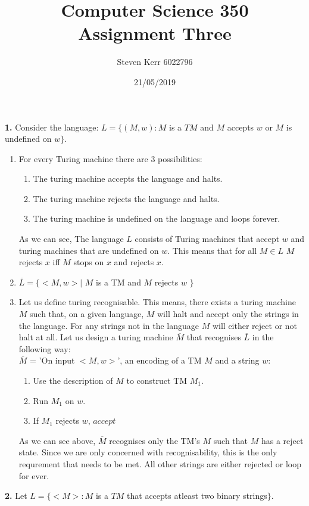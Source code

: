 \documentclass[a4paper,12pt]{article}
\title{Computer Science 350 \\
\large Assignment Three}
\author{Steven Kerr 6022796}
\date{21/05/2019}
\begin{document}
\maketitle

\noindent \textbf{1.}
Consider the language: $L=\{(M,w) : M$ is a $TM$ and $M$ accepts $w$ or $M$ is undefined on $w\}$.
\noindent \begin{enumerate}[label=\alph*)]
\item For every Turing machine there are 3 possibilities:
\begin{enumerate}
\item The turing machine accepts the language and halts.
\item The turing machine rejects the language and halts.
\item The turing machine is undefined on the language and loops forever.
\end{enumerate}
As we can see, The language $L$ consists of Turing machines that accept $w$ and turing machines that are undefined on $w$. This means that for all $M \in L$ $M$ rejects $x$ iff $M$ stops on $x$ and rejects $x$.
\item $\overline{L}=\{ <M, w> |$ $M$ is a TM and $M$ rejects $w$ $\}$ 
\item Let us define turing recognisable. This means, there exists a turing machine $M$ such that, on a given language, $M$ will halt and accept only the strings in the language. For any strings not in the language $M$ will either reject or not halt at all.
Let us design a turing machine $\overline{M}$ that recognises $\overline{L}$ in the following way: \\
$\overline{M}$ = 'On input $<M, w>$', an encoding of a TM $M$ and a string $w$:
\begin{enumerate}[label=\arabic*)]
\item Use the description of $M$ to construct TM $M_1$.
\item Run $M_1$ on $w$.
\item If $M_1$ rejects $w$, $accept$ 
\end{enumerate}
As we can see above, $\overline{M}$ recognises only the TM's $M$ such that $M$ has a reject state. Since we are only concerned with recognisability, this is the only requrement that needs to be met. All other strings are either rejected or loop for ever.
\end{enumerate}
\newpage
\noindent \textbf{2.}
Let $L=\{<M> : M$ is a $TM$ that accepts atleast two binary strings$\}$.
\end{document}
